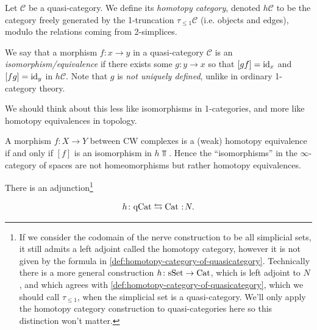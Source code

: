 \documentclass[11pt,openany]{book}
\begin{document}
\begin{definition}\label{def:homotopy-category-of-quasicategory} 
Let $\mathscr{C}$ be a quasi-category. We define its \textit{homotopy category}, denoted $h\mathscr{C}$ to be the category freely generated by the 1-truncation $\tau_{\le 1} \mathscr{C}$ (i.e. objects and edges), modulo the relations coming from 2-simplices.
\end{definition}

\begin{definition} We say that a morphism $f \colon x \to y$ in a quasi-category $\mathscr{C}$ is an \textit{isomorphism/equivalence} if there exists some $g \colon y \to x$ so that $[gf]=\mathrm{id}_x$ and $[fg]=\mathrm{id}_y$ in $h\mathscr{C}$. Note that $g$ is \textit{not uniquely defined}, unlike in ordinary 1-category theory.
\end{definition}

\begin{remark} We should think about this less like isomorphisms in 1-categories, and more like homotopy equivalences in topology.
\end{remark}

\begin{example} A morphism $f\colon X\to Y$ between CW complexes is a (weak) homotopy equivalence if and only if $[f]$ is an isomorphism in $h\Top$. Hence the ``isomorphisms'' in the $\infty$-category of spaces are not homeomorphisms but rather homotopy equivalences.
\end{example}


\begin{proposition}\label{prop:nerve-adjunction}
There is an adjunction\footnote{%
If we consider the codomain of the nerve construction to be all simplicial sets, it still admits a left adjoint called the homotopy category, however it is not given by the formula in \autoref{def:homotopy-category-of-quasicategory}. Technically there is a more general construction $h \colon \mathrm{sSet}\to \mathrm{Cat}$, which is left adjoint to $N$, and which agrees with \autoref{def:homotopy-category-of-quasicategory}, which we should call $\tau_{\le 1}$, when the simplicial set is a quasi-category. We'll only apply the homotopy category construction to quasi-categories here so this distinction won't matter.
}


\begin{align*}
    h\colon \qCat \leftrightarrows \Cat \noloc N.
\end{align*}
\end{proposition}
\end{document}
